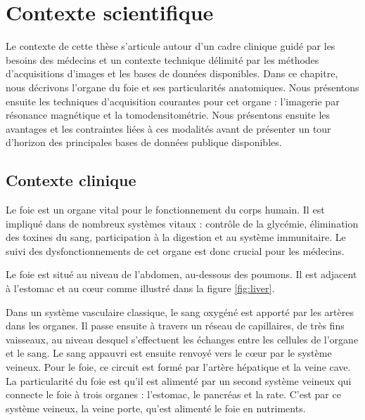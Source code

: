 %

\chapter{Contexte scientifique}
\label{sec:contexte}



Le contexte de cette thèse s'articule autour d'un cadre clinique guidé par les besoins des médecins et un contexte technique délimité par les méthodes d'acquisitions d'images et les bases de données disponibles. Dans ce chapitre, nous décrivons l'organe du foie et ses particularités anatomiques. Nous présentons ensuite les techniques d'acquisition courantes pour cet organe : l'imagerie par résonance magnétique et la tomodensitométrie. Nous présentons ensuite les avantages et les contraintes liées à ces modalités avant de présenter un tour d'horizon des principales bases de données publique disponibles.

\section{Contexte clinique}
\label{sec:contexte:clinique}

Le foie est un organe vital pour le fonctionnement du corps humain. Il est impliqué dans de nombreux systèmes vitaux : contrôle de la glycémie, élimination des toxines du sang, participation à la digestion et au système immunitaire. Le suivi des dysfonctionnements de cet organe est donc crucial pour les médecins.

Le foie est situé au niveau de l'abdomen, au-dessous des poumons. Il est adjacent à l'estomac et au cœur comme illustré dans la figure \ref{fig:liver}.

Dans un système vasculaire classique, le sang oxygéné est apporté par les artères dans les organes. Il passe ensuite à travers un réseau de capillaires, de très fins vaisseaux, au niveau desquel s'effectuent les échanges entre les cellules de l'organe et le sang. Le sang appauvri est ensuite renvoyé vers le cœur par le système veineux. Pour le foie, ce circuit est formé par l'artère hépatique et la veine cave. La particularité du foie est qu'il est alimenté par un second système veineux qui connecte le foie à trois organes : l'estomac, le pancréas et la rate. C'est par ce système veineux, la veine porte, qu'est alimenté le foie en nutriments.  

